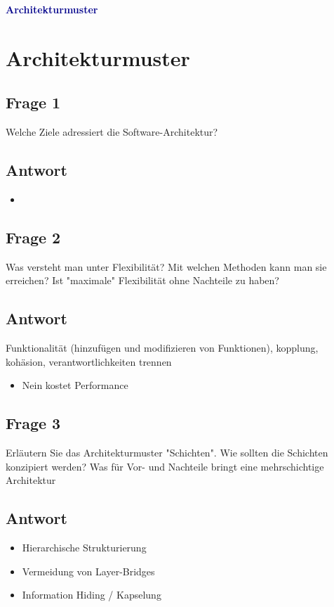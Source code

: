 \textbf{\textcolor{darkblue}{ Architekturmuster}}~

\section*{Architekturmuster}
\subsection*{Frage 1}
Welche Ziele adressiert die Software-Architektur?
\subsection*{Antwort}
\begin{itemize}
	\item 
\end{itemize}

\subsection*{Frage 2}
Was versteht man unter Flexibilität? Mit welchen Methoden kann man sie erreichen? Ist "maximale" Flexibilität ohne Nachteile zu haben?
\subsection*{Antwort}
Funktionalität (hinzufügen und modifizieren von Funktionen), 
kopplung, kohäsion, verantwortlichkeiten trennen
\begin{itemize}
	\item Nein kostet Performance
\end{itemize}

\subsection*{Frage 3}
Erläutern Sie das Architekturmuster "Schichten". Wie sollten die Schichten konzipiert werden? Was für Vor- und Nachteile bringt eine mehrschichtige Architektur
\subsection*{Antwort}
\begin{itemize}
	\item Hierarchische Strukturierung
	\item Vermeidung von Layer-Bridges
	\item Information Hiding / Kapselung
\end{itemize}

